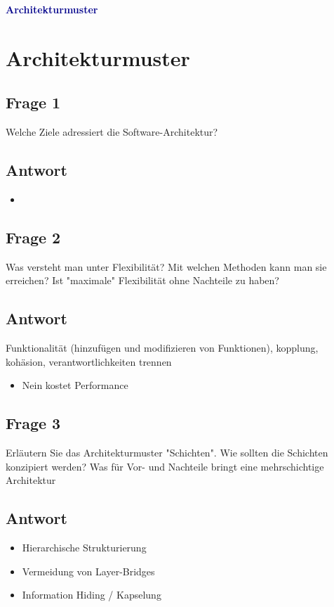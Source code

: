 \textbf{\textcolor{darkblue}{ Architekturmuster}}~

\section*{Architekturmuster}
\subsection*{Frage 1}
Welche Ziele adressiert die Software-Architektur?
\subsection*{Antwort}
\begin{itemize}
	\item 
\end{itemize}

\subsection*{Frage 2}
Was versteht man unter Flexibilität? Mit welchen Methoden kann man sie erreichen? Ist "maximale" Flexibilität ohne Nachteile zu haben?
\subsection*{Antwort}
Funktionalität (hinzufügen und modifizieren von Funktionen), 
kopplung, kohäsion, verantwortlichkeiten trennen
\begin{itemize}
	\item Nein kostet Performance
\end{itemize}

\subsection*{Frage 3}
Erläutern Sie das Architekturmuster "Schichten". Wie sollten die Schichten konzipiert werden? Was für Vor- und Nachteile bringt eine mehrschichtige Architektur
\subsection*{Antwort}
\begin{itemize}
	\item Hierarchische Strukturierung
	\item Vermeidung von Layer-Bridges
	\item Information Hiding / Kapselung
\end{itemize}

